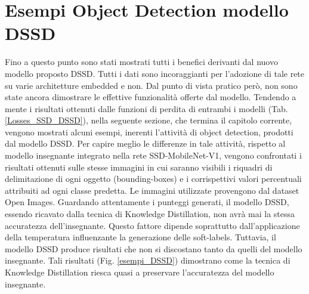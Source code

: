 \section{Esempi Object Detection modello DSSD}
Fino a questo punto sono stati mostrati tutti i benefici derivanti dal nuovo 
modello proposto DSSD. Tutti i dati sono incoraggianti per l'adozione di 
tale rete su varie architetture embedded e non. Dal punto di vista pratico 
però, non sono state ancora dimostrare le effettive funzionalità offerte dal 
modello. Tendendo a mente i risultati ottenuti dalle funzioni di perdita di entrambi 
i modelli (Tab. \ref{Losses_SSD_DSSD}), nella seguente sezione, che termina il capitolo corrente, vengono 
mostrati alcuni esempi, inerenti l'attività di object detection, prodotti dal 
modello DSSD. Per capire meglio le differenze in tale attività, rispetto al 
modello insegnante integrato nella rete SSD-MobileNet-V1, vengono confrontati 
i risultati ottenuti sulle stesse immagini in cui saranno visibili i 
riquadri di delimitazione di ogni oggetto (bounding-boxes) e i corrispettivi 
valori percentuali attribuiti ad ogni classe predetta. Le immagini utilizzate 
provengono dal dataset Open Images. Guardando attentamente i punteggi 
generati, il modello DSSD, essendo ricavato dalla tecnica di Knowledge 
Distillation, non avrà mai la stessa accuratezza dell'insegnante. Questo 
fattore dipende soprattutto dall'applicazione della temperatura influenzante 
la generazione delle soft-labels. Tuttavia, il modello DSSD produce risultati 
che non si discostano tanto da quelli del modello insegnante. Tali risultati 
(Fig. \ref{esempi_DSSD}) dimostrano come la tecnica di Knowledge Distillation riesca 
quasi a preservare l'accuratezza del modello insegnante. 

